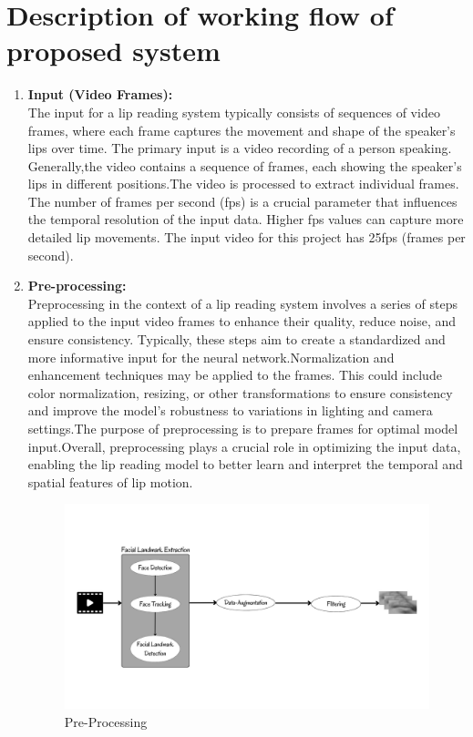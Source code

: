 \section{Description of working flow of proposed system}
\begin{enumerate}
	\item \textbf{Input (Video Frames):}
	\\ The input for a lip reading system typically consists of sequences of video frames, where each frame captures the movement and shape of the speaker's lips over time. The primary input is a video recording of a person speaking. Generally,the video contains a sequence of frames, each showing the speaker's lips in different positions.The video is processed to extract individual frames. The number of frames per second (fps) is a crucial parameter that influences the temporal resolution of the input data. Higher fps values can capture more detailed lip movements. The input video for this project has 25fps (frames per second).
	\item \textbf{Pre-processing:}
	\\Preprocessing in the context of a lip reading system involves a series of steps applied to the input video frames to enhance their quality, reduce noise, and ensure consistency. Typically, these steps aim to create a standardized and more informative input for the neural network.Normalization and enhancement techniques may be applied to the frames. This could include color normalization, resizing, or other transformations to ensure consistency and improve the model's robustness to variations in lighting and camera settings.The purpose of preprocessing is to prepare frames for optimal model input.Overall, preprocessing plays a crucial role in optimizing the input data, enabling the lip reading model to better learn and interpret the temporal and spatial features of lip motion.

	
	\begin{figure}[h]
	\centering
	\includegraphics[width=\linewidth]{images/pre-processing.jpg}
	\caption{Pre-Processing}
	

\end{figure}
\end{enumerate}
